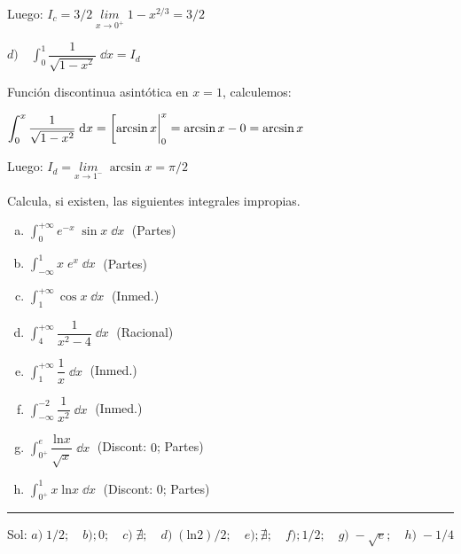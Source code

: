 \begin{miejercicio}
\vspace{2mm} Luego: $\displaystyle I_c=3/2 \; \underset{x\to 0^+}{lim}\; {1-x^{2/3}}= 3/2$


\vspace{4mm} $d) \quad \displaystyle \int_{0}^{1} \dfrac {1}{\sqrt{1-x^2}} \; \dd x= I_d$

\vspace{2mm} Función discontinua asintótica en $x=1$, calculemos:

\vspace{2mm} $\displaystyle \int_{0}^{x} \dfrac {1}{\sqrt{1-x^2}} \; \dd x= \eval [\arcsin x|_0^x= \arcsin x - 0 = \arcsin x$

\vspace{2mm} Luego: $\displaystyle I_d=\underset {x\to 1^-}{lim}\;{\arcsin x}= \pi/2$
\end{miejercicio}


\vspace{5mm}

\begin{miejercicio}

Calcula, si existen, las siguientes integrales impropias.
\begin{multicols}{2}
\begin{enumerate}[a) ]
\item $\displaystyle \int_{0}^{+\infty} e^{-x}\; \sin x \; \dd x\; $ (Partes)
\item $\displaystyle \int_{-\infty}^1{} x\; e^x \;  \dd x\; $ (Partes)
\item $\displaystyle \int_{1}^{+\infty} \cos x \;  \dd x\; $ (Inmed.)
\item $\displaystyle \int_{4}^{+\infty} \dfrac {1}{x^2-4}\;  \dd x\; $ (Racional)
\item $\displaystyle \int_{1}^{+\infty} \dfrac 1 x \;  \dd x\; $ (Inmed.)
\item $\displaystyle \int_{-\infty}^{-2} \dfrac 1 {x^2} \;  \dd x\; $ (Inmed.)
\item $\displaystyle \int_{0^+}^{e} \dfrac {\mathrm{ln} x}{\sqrt{x}} \;  \dd x\; $ (Discont: $0$; Partes)
\item $\displaystyle \int_{0^+}^{1} x\; \mathrm{ln} x \;  \dd x\; $ (Discont: $0$; Partes)
\end{enumerate}	
\end{multicols}

\rule{200pt}{0.1pt}

\vspace{3mm}

\textcolor{gris}{Sol: $a)\;1/2;\quad b); 0;\quad c)\; \nexists; \quad d)\; (\mathrm{ln}2)/2; \quad e); \nexists; \quad f); 1/2; \quad g)\; -\sqrt{e}; \quad h)\; -1/4 $}
\end{miejercicio}







